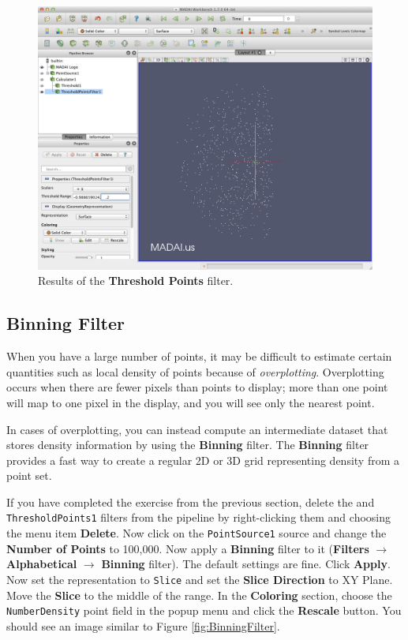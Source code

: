 \documentclass[12pt]{article}
\newcommand{\filter}[1]{\textbf{#1}}
\newcommand{\filterinstance}[1]{\texttt{#1}}
\newcommand{\menu}[1]{\textbf{#1}}
\newcommand{\representation}[1]{\texttt{#1}}
\newcommand{\setting}[1]{\textbf{#1}}
\newcommand{\field}[1]{\texttt{#1}}
\begin{document}
\begin{figure}[htbp]
   \centering
   \includegraphics[scale=.25]{images/ThresholdPointsFilter.png} %
   \caption{Results of the \filter{Threshold Points} filter.}
   \label{fig:ThresholdPointsFilter}
\end{figure}

\subsection{Binning Filter}

When you have a large number of points, it may be difficult to estimate certain quantities such as local density of points because of \emph{overplotting}. Overplotting occurs when there are fewer pixels than points to display; more than one point will map to one pixel in the display, and you will see only the nearest point.

In cases of overplotting, you can instead compute an intermediate dataset that stores density information by using the \filter{Binning} filter. The \filter{Binning} filter provides a fast way to create a regular 2D or 3D grid representing density from a point set.

If you have completed the exercise from the previous section, delete the and \filterinstance{ThresholdPoints1} filters from the pipeline by right-clicking them and choosing the menu item \menu{Delete}. Now click on the \filterinstance{PointSource1} source and change the \setting{Number of Points} to 100,000. Now apply a \filter{Binning} filter to it (\menu{Filters} $\rightarrow$ \menu{Alphabetical} $\rightarrow$ \menu{Binning} filter). The default settings are fine. Click \setting{Apply}. Now set the representation to \representation{Slice} and set the \setting{Slice Direction} to XY Plane. Move the \setting{Slice} to the middle of the range. In the \setting{Coloring} section, choose the \field{NumberDensity} point field in the popup menu and click the \setting{Rescale} button. You should see an image similar to Figure \ref{fig:BinningFilter}.
\end{document}
